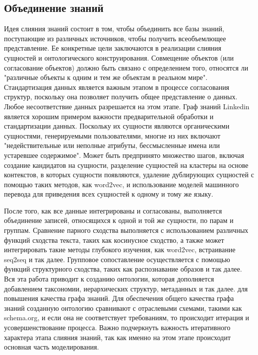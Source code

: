 \subsection{Объединение знаний}

Идея слияния знаний состоит в том, чтобы объединить все базы знаний, поступающие из различных источников, чтобы получить всеобъемлющее
представление. Ее конкретные цели заключаются в реализации слияния сущностей и онтологического конструирования. Совмещение объектов (или
согласование объектов) должно быть связано с определением того, относятся ли "различные объекты к одним и тем же объектам в реальном мире".
Стандартизация данных является важным этапом в процессе согласования структур, поскольку она позволяет получить общее представление о данных.
Любое несоответствие данных разрешается на этом этапе. Граф знаний Linkedin является хорошим примером важности предварительной обработки и
стандартизации данных. Поскольку их сущности являются органическими сущностями, генерируемыми пользователями, многие из них включают
"недействительные или неполные атрибуты, бессмысленные имена или устаревшее содержимое". Может быть предпринято множество шагов, включая
создание кандидатов на сущности, разделение сущностей на кластеры на основе контекстов, в которых сущности появляются, удаление дублирующих
сущностей с помощью таких методов, как word2vec, и использование моделей машинного перевода для приведения всех сущностей к одному и тому же языку.

После того, как все данные интегрированы и согласованы, выполняется объединение записей, относящихся к одной и той же сущности, по парам и
группам. Сравнение парного сходства выполняется с использованием различных функций сходства текста, таких как косинусное сходство, а также
может интегрировать такие методы глубокого изучения, как word2vec, встраивание seq2seq и так далее. Групповое сопоставление осуществляется
с помощью функций структурного сходства, таких как распознавание образов и так далее. Вся эта работа приводит к созданию онтологии, которая
дополняется добавлением таксономии, иерархических структур, метаданных и так далее. для повышения качества графа знаний. Для обеспечения
общего качества графа знаний созданную онтологию сравнивают с отраслевыми схемами, такими как schema.org, и если она не соответствует
требованиям, то происходит итерация и усовершенствование процесса. Важно подчеркнуть важность итеративного характера этапа слияния знаний,
так как именно на этом этапе происходит основная часть моделирования.

